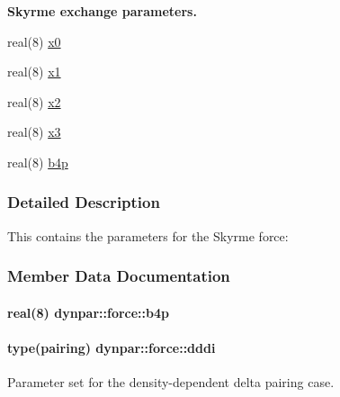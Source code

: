 \begin{Indent}{\bf Skyrme exchange parameters.}\par
\begin{DoxyCompactItemize}
\item 
real(8) \hyperlink{structdynpar_1_1force_af7aab292f412f7f9e9ac2927b6175205}{x0}
\item 
real(8) \hyperlink{structdynpar_1_1force_a706205b77588898cdb276b26269ba20e}{x1}
\item 
real(8) \hyperlink{structdynpar_1_1force_a9cacba05208b4df2c91029c560d7213c}{x2}
\item 
real(8) \hyperlink{structdynpar_1_1force_a3382a3314a6c8767a07c90e94246935d}{x3}
\item 
real(8) \hyperlink{structdynpar_1_1force_afc199e8ec8e41a19a706d323fa313ba9}{b4p}
\end{DoxyCompactItemize}
\end{Indent}


\subsubsection{Detailed Description}
This contains the parameters for the Skyrme force\+: 

\subsubsection{Member Data Documentation}
\paragraph[{\texorpdfstring{b4p}{b4p}}]{\setlength{\rightskip}{0pt plus 5cm}real(8) dynpar\+::force\+::b4p}\hypertarget{structdynpar_1_1force_afc199e8ec8e41a19a706d323fa313ba9}{}\label{structdynpar_1_1force_afc199e8ec8e41a19a706d323fa313ba9}
\paragraph[{\texorpdfstring{dddi}{dddi}}]{\setlength{\rightskip}{0pt plus 5cm}type({\bf pairing}) dynpar\+::force\+::dddi}\hypertarget{structdynpar_1_1force_a7508e820b8361b43a84a5c680b6e78ec}{}\label{structdynpar_1_1force_a7508e820b8361b43a84a5c680b6e78ec}


Parameter set for the density-\/dependent delta pairing case. 

